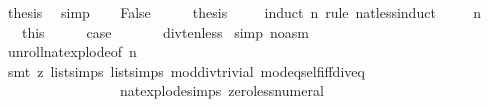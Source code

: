 \begin{isabellebody}
\ {\isacharquery}{\kern0pt}thesis\ \isamarkupfalse%
\ simp\isanewline
{}\isamarkupfalse%
\isanewline
\ \ \isamarkupfalse%
\ False\isanewline
\ \ \isamarkupfalse%
\ \isamarkupfalse%
\ {\isacharquery}{\kern0pt}thesis\ \isanewline
\ \ \isamarkupfalse%
\ {\isacharparenleft}{\kern0pt}induct\ {\isacartoucheopen}n{\isacartoucheclose}\ rule{\isacharcolon}{\kern0pt}\ nat{\isacharunderscore}{\kern0pt}less{\isacharunderscore}{\kern0pt}induct{\isacharparenright}{\kern0pt}\isanewline
\ \ \isamarkupfalse%
\ {\isacharparenleft}{\kern0pt}{}\ n{\isacharparenright}{\kern0pt}\ \isamarkupfalse%
\ {\isacharasterisk}{\kern0pt}\ {\isacharequal}{\kern0pt}\ this\isanewline
\ \ \isamarkupfalse%
\ \isamarkupfalse%
\ {\isacharquery}{\kern0pt}case\ \isanewline
\ \ \ \ \isamarkupfalse%
\ div{\isacharunderscore}{\kern0pt}ten{\isacharunderscore}{\kern0pt}less\ \isamarkupfalse%
{\isacharparenleft}{\kern0pt}simp\ {\isacharparenleft}{\kern0pt}no{\isacharunderscore}{\kern0pt}asm{\isacharparenright}{\kern0pt}{\isacharparenright}{\kern0pt}\ \ \isanewline
\ \ \ \ \isamarkupfalse%
\ unroll{\isacharunderscore}{\kern0pt}nat{\isacharunderscore}{\kern0pt}explode{\isacharprime}{\kern0pt}{\isacharbrackleft}{\kern0pt}of\ n{\isacharbrackright}{\kern0pt}\ {\isacharasterisk}{\kern0pt}\ \isanewline
\ \ \ \ \isamarkupfalse%
\ {\isacharparenleft}{\kern0pt}smt\ {\isacharparenleft}{\kern0pt}z{}{\isacharparenright}{\kern0pt}\ list{\isachardot}{\kern0pt}simps{\isacharparenleft}{\kern0pt}{}{\isacharparenright}{\kern0pt}\ list{\isachardot}{\kern0pt}simps{\isacharparenleft}{\kern0pt}{}{\isacharparenright}{\kern0pt}\ mod{\isacharunderscore}{\kern0pt}div{\isacharunderscore}{\kern0pt}trivial\ mod{\isacharunderscore}{\kern0pt}eq{\isacharunderscore}{\kern0pt}self{\isacharunderscore}{\kern0pt}iff{\isacharunderscore}{\kern0pt}div{\isacharunderscore}{\kern0pt}eq{\isacharunderscore}{\kern0pt}{}\ \isanewline
\ \ \ \ \ \ \ \ \ \ \ \ \ \ \ \ \ nat{\isacharunderscore}{\kern0pt}explode{\isacharprime}{\kern0pt}{\isachardot}{\kern0pt}simps\ zero{\isacharunderscore}{\kern0pt}less{\isacharunderscore}{\kern0pt}numeral{\isacharparenright}{\kern0pt}\isanewline
\ \ \isamarkupfalse%
\isanewline
{}\isamarkupfalse%
%
\endisatagproof
{\isafoldproof}%
%
\isadelimproof
\isanewline
%
\endisadelimproof
\isanewline
{}\isamarkupfalse%

\end{isabellebody}
